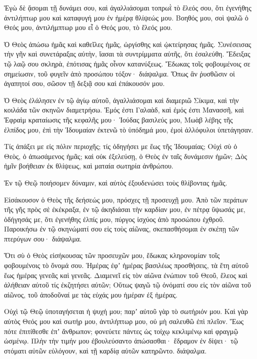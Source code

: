 \begin{spacing}{1.1}
\begin{multicols}{2}
Ἐγὼ δὲ ᾄσομαι τῇ δυνάμει σου, καὶ ἀγαλλιάσομαι τοπρωῒ τὸ ἔλεός σου, ὅτι ἐγενήθης ἀντιλήπτωρ μου καὶ καταφυγή μου ἐν ἡμέρᾳ θλίψεώς μου.
Βοηθός μου, σοὶ ψαλῶ ὁ Θεός μου, ἀντιλήμπτωρ μου εἶ ὁ Θεός μου, τὸ ἔλεός μου.

Ὁ Θεὸς ἀπώσω ἡμᾶς καὶ καθεῖλες ἡμᾶς, ὠργίσθης καὶ ᾠκτείρησας ἡμᾶς.
Συνέσεισας τὴν γῆν καὶ συνετάραξας αὐτὴν, ἴασαι τὰ συντρίμματα αὐτῆς, ὅτι ἐσαλεύθη.
Ἔδειξας τῷ λαῷ σου σκληρὰ, ἐπότισας ἡμᾶς οἶνον κατανύξεως.
Ἔδωκας τοῖς φοβουμένοις σε σημείωσιν, τοῦ φυγεῖν ἀπὸ προσώπου τόξον· διάψαλμα.
Ὅπως ἂν ῥυσθῶσιν οἱ ἀγαπητοί σου, σῶσον τῇ δεξιᾷ σου καὶ ἐπάκουσόν μου.

Ὁ Θεὸς ἐλάλησεν ἐν τῷ ἁγίῳ αὐτοῦ, ἀγαλλιάσομαι καὶ διαμεριῶ Σίκιμα, καὶ τὴν κοιλάδα τῶν σκηνῶν διαμετρήσω.
Ἐμός ἐστι Γαλαὰδ, καὶ ἐμός ἐστι Μανασσῆ, καὶ Ἐφραὶμ κραταίωσις τῆς κεφαλῆς μου· Ἰούδας βασιλεύς μου,
Μωὰβ λέβης τῆς ἐλπίδος μου, ἐπὶ τὴν Ἰδουμαίαν ἐκτενῶ τὸ ὑπόδημά μου, ἐμοὶ ἀλλόφυλοι ὑπετάγησαν.

Τίς ἀπάξει με εἰς πόλιν περιοχῆς; τίς ὁδηγήσει με ἕως τῆς Ἰδουμαίας;
Οὐχὶ σὺ ὁ Θεὸς, ὁ ἀπωσάμενος ἡμᾶς; καὶ οὐκ ἐξελεύσῃ, ὁ Θεὸς ἐν ταῖς δυνάμεσιν ἡμῶν;
Δὸς ἡμῖν βοήθειαν ἐκ θλίψεως, καὶ ματαία σωτηρία ἀνθρώπου.

Ἐν τῷ Θεῷ ποιήσομεν δύναμιν, καὶ αὐτὸς ἐξουδενώσει τοὺς θλίβοντας ἡμᾶς.

Εἰσάκουσον ὁ Θεὸς τῆς δεήσεώς μου, πρόσχες τῇ προσευχῇ μου.
Ἀπὸ τῶν περάτων τῆς γῆς πρὸς σὲ ἐκέκραξα, ἐν τῷ ἀκηδιάσαι τὴν καρδίαν μου, ἐν πέτρᾳ ὕψωσάς με, ὁδήγησάς με,
ὅτι ἐγενήθης ἐλπίς μου, πύργος ἰσχύος ἀπὸ προσώπου ἐχθροῦ.
Παροικήσω ἐν τῷ σκηνώματί σου εἰς τοὺς αἰῶνας, σκεπασθήσομαι ἐν σκέπῃ τῶν πτερύγων σου· διάψαλμα.

Ὅτι σὺ ὁ Θεὸς εἰσήκουσας τῶν προσευχῶν μου, ἔδωκας κληρονομίαν τοῖς φοβουμένοις τὸ ὄνομά σου.
Ἡμέρας ἐφʼ ἡμέρας βασιλέως προσθήσεις, τὰ ἔτη αὐτοῦ ἕως ἡμέρας γενεᾶς καὶ γενεᾶς.
Διαμενεῖ εἰς τὸν αἰῶνα ἐνώπιον τοῦ Θεοῦ, ἔλεος καὶ ἀλήθειαν αὐτοῦ τίς ἐκζητήσει αὐτῶν;
Οὕτως ψαγῶ τῷ ὀνόματί σου εἰς τὸν αἰῶνα τοῦ αἰῶνος, τοῦ ἀποδοῦναί με τὰς εὐχάς μου ἡμέραν ἐξ ἡμέρας.

Οὐχὶ τῷ Θεῷ ὑποταγήσεται ἡ ψυχή μου; παρʼ αὐτοῦ γὰρ τὸ σωτήριόν μου.
Καὶ γὰρ αὐτὸς Θεός μου καὶ σωτήρ μου, ἀντιλήπτωρ μου, οὐ μὴ σαλευθῶ ἐπὶ πλεῖον.
Ἕως πότε ἐπιτίθεσθε ἐπʼ ἄνθρωπον; φονεύετε πάντες ὡς τοίχῳ κεκλιμένῳ καὶ φραγμῷ ὠσμένῳ.
Πλὴν τὴν τιμήν μου ἐβουλεύσαντο ἀπώσασθαι· ἔδραμον ἐν δίψει· τῷ στόματι αὐτῶν εὐλόγουν, καὶ τῇ καρδίᾳ αὐτῶν κατηρῶντο. διάψαλμα.


\end{multicols}
\end{spacing}
